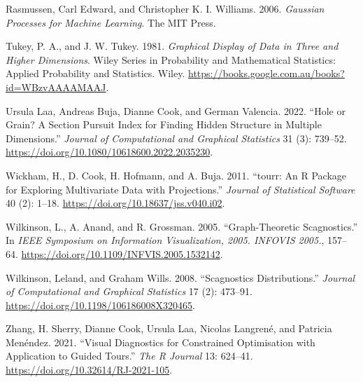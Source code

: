 \documentclass[
  12pt,
]{interact}
\newlength{\cslhangindent}
\newenvironment{CSLReferences}[2] %
 {\begin{list}{}{%
  \setlength{\itemindent}{0pt}
  \setlength{\leftmargin}{0pt}
  \setlength{\parsep}{0pt}
  \ifodd #1
   \setlength{\leftmargin}{\cslhangindent}
   \setlength{\itemindent}{-1\cslhangindent}
  \fi
  \setlength{\itemsep}{#2\baselineskip}}}
 {\end{list}}
\theoremstyle{plain}
\begin{document}
\begin{CSLReferences}{1}{0}
Rasmussen, Carl Edward, and Christopher K. I. Williams. 2006.
\emph{Gaussian Processes for Machine Learning}. The MIT Press.

Tukey, P. A., and J. W. Tukey. 1981. \emph{Graphical Display of Data in
Three and Higher Dimensions}. Wiley Series in Probability and
Mathematical Statistics: Applied Probability and Statistics. Wiley.
\url{https://books.google.com.au/books?id=WBzvAAAAMAAJ}.

Ursula Laa, Andreas Buja, Dianne Cook, and German Valencia. 2022.
{``Hole or Grain? A Section Pursuit Index for Finding Hidden Structure
in Multiple Dimensions.''} \emph{Journal of Computational and Graphical
Statistics} 31 (3): 739--52.
\url{https://doi.org/10.1080/10618600.2022.2035230}.

Wickham, H., D. Cook, H. Hofmann, and A. Buja. 2011. {``{tourr}: An {R}
Package for Exploring Multivariate Data with Projections.''}
\emph{Journal of Statistical Software} 40 (2): 1--18.
\url{https://doi.org/10.18637/jss.v040.i02}.

Wilkinson, L., A. Anand, and R. Grossman. 2005. {``Graph-Theoretic
Scagnostics.''} In \emph{IEEE Symposium on Information Visualization,
2005. INFOVIS 2005.}, 157--64.
\url{https://doi.org/10.1109/INFVIS.2005.1532142}.

Wilkinson, Leland, and Graham Wills. 2008. {``Scagnostics
Distributions.''} \emph{Journal of Computational and Graphical
Statistics} 17 (2): 473--91.
\url{https://doi.org/10.1198/106186008X320465}.

Zhang, H. Sherry, Dianne Cook, Ursula Laa, Nicolas Langrené, and
Patricia Menéndez. 2021. {``Visual Diagnostics for Constrained
Optimisation with Application to Guided Tours.''} \emph{The R Journal}
13: 624--41. \url{https://doi.org/10.32614/RJ-2021-105}.

\end{CSLReferences}
\end{document}
